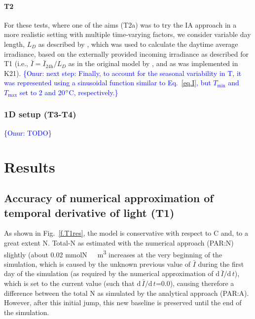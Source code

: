 \documentclass[gmd, manuscript, draft]{copernicus}
\newcommand{\onur}[1]{\textcolor{blue}{\{Onur: #1\}}}
\begin{document}
    
    \paragraph{T2}
    For these tests, where one of the aims (T2a) was to try the IA approach in a more realistic setting with multiple time-varying factors, we consider variable day length, $L_D$ as described by \citet{Forsythe2003}, which was used to calculate the daytime average irradiance, based on the externally provided incoming irradiance as described for T1 (i.e., $\bar{I}=\bar{I}_{\text{24h}}/L_D$ as in the original model by \citep{Pahlowetal13}, and as was implemented in K21). \onur{next step: Finally, to account for the seasonal variability in T, it was represented using a sinusoidal function similar to Eq.~\ref{eq.I}, but $T_{\min}$ and $T_{\max}$ set to 2 and 20$^{\circ}$C, respectively.}
    
\subsubsection{1D setup (T3-T4)}
    \onur{TODO}





\section{Results}

\subsection{Accuracy of numerical approximation of temporal derivative of light (T1)}
As shown in Fig.~\ref{f.T1res}, the model is conservative with respect to C and, to a great extent N\@. Total-N as estimated with the numerical approach (PAR:N) slightly (about 0.02 \unit{mmolN\ m^3} increases at the very beginning of the simulation, which is caused by the unknown previous value of $\bar{I}$ during the first day of the simulation (as required by the numerical approximation of $\text{d}\,\bar{I}/\text{d}\,t$), which is set to the current value (such that $\text{d}\,\bar{I}/\text{d}\,t$=0.0), causing therefore a difference between the total N as simulated by the analytical approach (PAR:A). However, after this initial jump, this new baseline is preserved until the end of the simulation.
\end{document}
